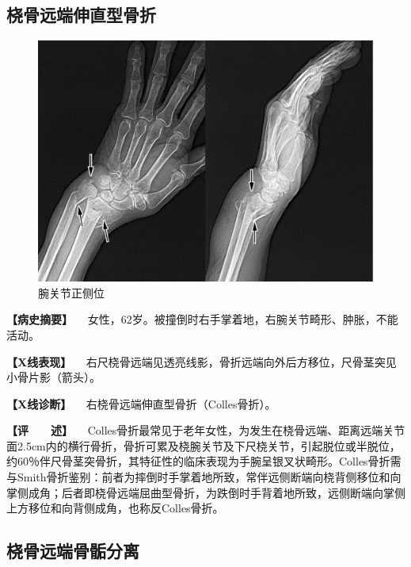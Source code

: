 \subsection{桡骨远端伸直型骨折}

\begin{figure}[!htbp]
 \centering
 \includegraphics{./images/Image00036.jpg}
 \captionsetup{justification=centering}
 \caption{腕关节正侧位}
 \label{fig2-3-9}
  \end{figure} 

\textbf{【病史摘要】}
　女性，62岁。被撞倒时右手掌着地，右腕关节畸形、肿胀，不能活动。

\textbf{【X线表现】}
　右尺桡骨远端见透亮线影，骨折远端向外后方移位，尺骨茎突见小骨片影（箭头）。

\textbf{【X线诊断】} 　右桡骨远端伸直型骨折（Colles骨折）。

\textbf{【评　　述】}
　Colles骨折最常见于老年女性，为发生在桡骨远端、距离远端关节面2.5cm内的横行骨折，骨折可累及桡腕关节及下尺桡关节，引起脱位或半脱位，约60％伴尺骨茎突骨折，其特征性的临床表现为手腕呈银叉状畸形。Colles骨折需与Smith骨折鉴别：前者为摔倒时手掌着地所致，常伴远侧断端向桡背侧移位和向掌侧成角；后者即桡骨远端屈曲型骨折，为跌倒时手背着地所致，远侧断端向掌侧上方移位和向背侧成角，也称反Colles骨折。

\subsection{桡骨远端骨骺分离}

